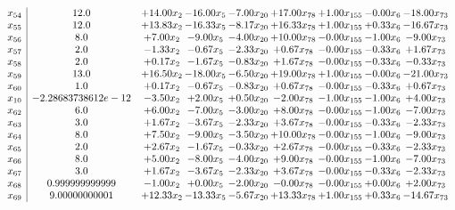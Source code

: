 \documentclass[8pt]{article}
\begin{document}
\[\begin{array}{c| c c@{\hskip 2pt} c@{\hskip 2pt} c@{\hskip 2pt} c@{\hskip 2pt} c@{\hskip 2pt} c@{\hskip 2pt} c@{\hskip 2pt} }
 x_{54}   &  12.0 & + 14.00 x_{2} & -16.00 x_{5} & -7.00 x_{20} & + 17.00 x_{78} & +  1.00 x_{155} & -0.00 x_{6} & -18.00 x_{73}\\
 x_{55}   &  12.0 & + 13.83 x_{2} & -16.33 x_{5} & -8.17 x_{20} & + 16.33 x_{78} & +  1.00 x_{155} & +  0.33 x_{6} & -16.67 x_{73}\\
 x_{56}   &  8.0 & +  7.00 x_{2} & -9.00 x_{5} & -4.00 x_{20} & + 10.00 x_{78} & -0.00 x_{155} & -1.00 x_{6} & -9.00 x_{73}\\
 x_{57}   &  2.0 & -1.33 x_{2} & -0.67 x_{5} & -2.33 x_{20} & +  0.67 x_{78} & -0.00 x_{155} & -0.33 x_{6} & +  1.67 x_{73}\\
 x_{58}   &  2.0 & +  0.17 x_{2} & -1.67 x_{5} & -0.83 x_{20} & +  1.67 x_{78} & -0.00 x_{155} & -0.33 x_{6} & -0.33 x_{73}\\
 x_{59}   &  13.0 & + 16.50 x_{2} & -18.00 x_{5} & -6.50 x_{20} & + 19.00 x_{78} & +  1.00 x_{155} & -0.00 x_{6} & -21.00 x_{73}\\
 x_{60}   &  1.0 & +  0.17 x_{2} & -0.67 x_{5} & -0.83 x_{20} & +  0.67 x_{78} & -0.00 x_{155} & -0.33 x_{6} & +  0.67 x_{73}\\
 x_{10}   &  -2.28683738612e-12 & -3.50 x_{2} & +  2.00 x_{5} & +  0.50 x_{20} & -2.00 x_{78} & -1.00 x_{155} & -1.00 x_{6} & +  4.00 x_{73}\\
 x_{62}   &  6.0 & +  6.00 x_{2} & -7.00 x_{5} & -3.00 x_{20} & +  8.00 x_{78} & -0.00 x_{155} & -1.00 x_{6} & -7.00 x_{73}\\
 x_{63}   &  3.0 & +  1.67 x_{2} & -3.67 x_{5} & -2.33 x_{20} & +  3.67 x_{78} & -0.00 x_{155} & -0.33 x_{6} & -2.33 x_{73}\\
 x_{64}   &  8.0 & +  7.50 x_{2} & -9.00 x_{5} & -3.50 x_{20} & + 10.00 x_{78} & -0.00 x_{155} & -1.00 x_{6} & -9.00 x_{73}\\
 x_{65}   &  2.0 & +  2.67 x_{2} & -1.67 x_{5} & -0.33 x_{20} & +  2.67 x_{78} & -0.00 x_{155} & -0.33 x_{6} & -2.33 x_{73}\\
 x_{66}   &  8.0 & +  5.00 x_{2} & -8.00 x_{5} & -4.00 x_{20} & +  9.00 x_{78} & -0.00 x_{155} & -1.00 x_{6} & -7.00 x_{73}\\
 x_{67}   &  3.0 & +  1.67 x_{2} & -3.67 x_{5} & -2.33 x_{20} & +  3.67 x_{78} & -0.00 x_{155} & -0.33 x_{6} & -2.33 x_{73}\\
 x_{68}   &  0.999999999999 & -1.00 x_{2} & +  0.00 x_{5} & -2.00 x_{20} & -0.00 x_{78} & -0.00 x_{155} & +  0.00 x_{6} & +  2.00 x_{73}\\
 x_{69}   &  9.00000000001 & + 12.33 x_{2} & -13.33 x_{5} & -5.67 x_{20} & + 13.33 x_{78} & +  1.00 x_{155} & +  0.33 x_{6} & -14.67 x_{73}\\

\end{array}\]
\end{document}
